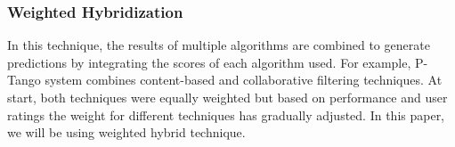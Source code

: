 \subsubsection{Weighted Hybridization}
In this technique, the results of multiple algorithms are combined to generate predictions by integrating the scores of each algorithm used. For example, \cite{41} P-Tango system combines content-based and collaborative filtering techniques. At start, both techniques were equally weighted but based on performance and user ratings the weight for different techniques has gradually adjusted. In this paper, we will be using weighted hybrid technique.



